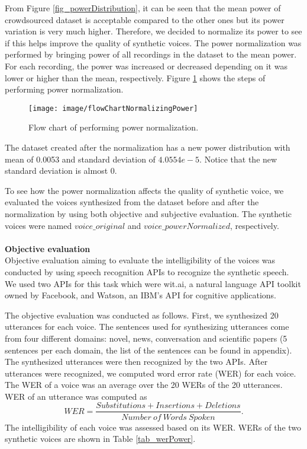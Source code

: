 \documentclass[12pt]{article}
\begin{document}
From Figure \ref{fig_powerDistribution}, it can be seen that the mean power of crowdsourced dataset is acceptable compared to the other ones but its power variation is very much higher. Therefore, we decided to normalize its power to see if this helps improve the quality of synthetic voices. The power normalization was performed by bringing power of all recordings in the dataset to the mean power. For each recording, the power was increased or decreased depending on it was lower or higher than the mean, respectively. Figure \ref{fig_normalizingPower} shows the steps of performing power normalization.
\begin{figure}[t]
\begin{center}
\texttt{[image: image/flowChartNormalizingPower]}
\end{center}
\vspace{-0.3cm}
\caption[performing power normalization.]{Flow chart of performing power normalization.}
\label{fig_normalizingPower}
\end{figure}
The dataset created after the normalization has a new power distribution with mean of 0.0053 and standard deviation of $4.0554e-5$. Notice that the new standard deviation is almost 0.

To see how the power normalization affects the quality of synthetic voice, we evaluated the voices synthesized from the dataset before and after the normalization by using both objective and subjective evaluation. The synthetic voices were named $voice\_original$ and $voice\_powerNormalized$, respectively.\\\\
\textbf{Objective evaluation}
\vspace{0.28cm}\\
Objective evaluation aiming to evaluate the intelligibility of the voices was conducted by using speech recognition APIs to recognize the synthetic speech. We used two APIs for this task which were wit.ai, a natural language API toolkit owned by Facebook, and Watson, an IBM’s API for cognitive applications.

The objective evaluation was conducted as follows. First, we synthesized 20 utterances for each voice. The sentences used for synthesizing utterances come from four different domains: novel, news, conversation and scientific papers (5 sentences per each domain, the list of the sentences can be found in appendix). The synthesized utterances were then recognized by the two APIs. After utterances were recognized, we computed word error rate (WER) for each voice. The WER of a voice was an average over the 20 WERs of the 20 utterances. WER of an utterance was computed as
\begin{equation}\label{exp_wer}
    WER = \frac{Substitutions + Insertions + Deletions}{Number\:of\:Words\:Spoken}.
\end{equation}
The intelligibility of each voice was assessed based on its WER. WERs of the two synthetic voices are shown in Table \ref{tab_werPower}.
\end{document}
